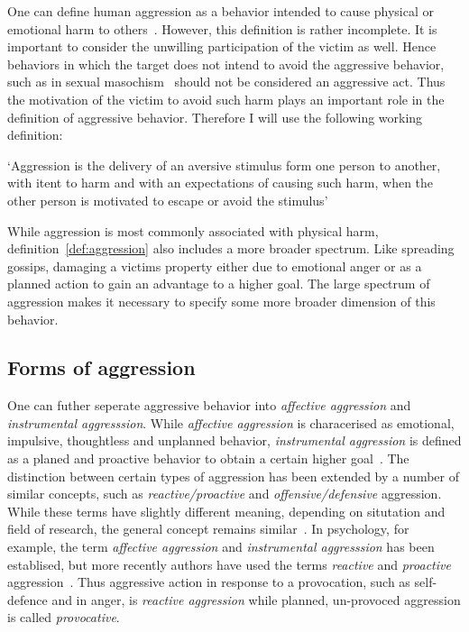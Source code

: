 One can define human aggression as a behavior intended to cause physical or emotional harm to others~\cite{Anderson2002}.
However, this definition is rather incomplete.
It is important to consider the unwilling participation of the victim as well.
Hence behaviors in which the target does not intend to avoid the aggressive behavior, such as in sexual masochism~\cite{Berkowitz1993,Baumeister1989,Baron2007,Geen2001} should not be considered an aggressive act.
Thus the motivation of the victim to avoid such harm plays an important role in the definition of aggressive behavior.  
Therefore I will use the following working definition:
\begin{mydef}[Aggression]\label{def:aggression}
	`Aggression is the delivery of an aversive stimulus form one person to another, with itent to harm and with an expectations of causing such harm, when the other person is motivated to escape or avoid the stimulus'~\cite{Geen2001}
\end{mydef}

While aggression is most commonly associated with physical harm, definition~\ref{def:aggression} also includes a more broader spectrum.
Like spreading gossips, damaging a victims property either due to emotional anger or as a planned action to gain an advantage to a higher goal.
The large spectrum of aggression makes it necessary to specify some more broader dimension of this behavior.

\subsection{Forms of aggression}
\label{sub:forms_of_aggression}

One can futher seperate aggressive behavior into \textit{affective aggression} and \textit{instrumental aggresssion}.
While \textit{affective aggression} is characerised as emotional, impulsive, thoughtless and unplanned behavior, \textit{instrumental aggression} is defined as a planed and proactive behavior to obtain a certain higher goal~\cite{Berkowitz1993,Geen2001}.
The distinction between certain types of aggression has been extended by a number of similar concepts, such as \textit{reactive/proactive} and \textit{offensive/defensive} aggression.
While these terms have slightly different meaning, depending on situtation and field of research, the general concept remains similar~\cite{Geen2001, Blanchard2005b}.
In psychology, for example, the term \textit{affective aggression} and \textit{instrumental aggresssion} has been establised, but more recently authors have used the terms \textit{reactive} and \textit{proactive} aggression~\cite{Geen2001}.
Thus aggressive action in response to a provocation, such as self-defence and in anger, is \textit{reactive aggression} while planned, un-provoced aggression is called \textit{provocative}.


